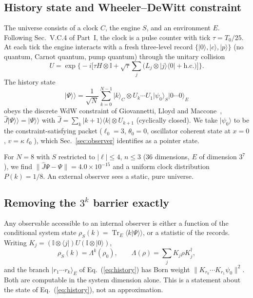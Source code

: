 \documentclass[aps,prc,twocolumn,superscriptaddress,amsmath,amssymb,nofootinbib]{revtex4-2}
\newcommand{\ket}[1]{\lvert #1\rangle}
\newcommand{\bra}[1]{\langle #1\rvert}
\newcommand{\kket}[1]{\lvert #1\rangle\rangle}
\newcommand{\Tr}{\operatorname{Tr}}
\begin{document}
\subsection{History state and Wheeler--DeWitt constraint}
The universe consists of a clock $C$, the engine $S$, and an environment $E$. Following Sec.~V.C.4 of Part~I, the clock is a pulse counter with tick $\tau=T_0/25$. At each tick the engine interacts with a fresh three-level record $\{\ket0,\ket{c},\ket{p}\}$ (no quantum, Carnot quantum, pump quantum) through the unitary collision~\cite{Ciccarello2022}
\begin{equation}
U=\exp\Big\{-i\Big[\tau H\otimes\mathbb{I}+\sqrt\tau\sum_{j}\big(L_j\otimes\ket{j}\bra0+\text{h.c.}\big)\Big]\Big\}.
\label{eq:collision}
\end{equation}
The history state
\begin{equation}
\kket\Psi=\frac1{\sqrt N}\sum_{k=0}^{N-1}\ket k_C\otimes U_k\cdots U_1\ket{\psi_0}_S\ket{0\cdots0}_E
\label{eq:history}
\end{equation}
obeys the discrete WdW constraint of Giovannetti, Lloyd and Maccone~\cite{GLM2015}, $\hat J\kket\Psi=\kket\Psi$ with $\hat J=\sum_k\ket{k+1}\bra k\otimes U_{k+1}$ (cyclically closed). We take $\ket{\psi_0}$ to be the constraint-satisfying packet ($\ell_0=3$, $\theta_0=0$, oscillator coherent state at $x=0$, $v=\kappa\ell_0$), which Sec.~\ref{sec:observer} identifies as a pointer state.

For $N=8$ with $S$ restricted to $|\ell|\le4$, $n\le3$ (36 dimensions, $E$ of dimension $3^7$), we find $\|\hat J\Psi-\Psi\|=4.0\times10^{-15}$ and a uniform clock distribution $P(k)=1/8$. An external observer sees a static, pure universe.

\subsection{Removing the $3^k$ barrier exactly}
Any observable accessible to an internal observer is either a function of the conditional system state $\rho_S(k)=\Tr_E\langle k|\Psi\rangle\rangle$, or a statistic of the records. Writing $K_j=(\mathbb{I}\otimes\bra j)U(\mathbb{I}\otimes\ket0)$,
\begin{equation}
\rho_S(k)=\Lambda^k(\rho_0),\qquad \Lambda(\rho)=\sum_jK_j\rho K_j^\dagger ,
\end{equation}
and the branch $\ket{r_1\cdots r_k}_E$ of Eq.~(\ref{eq:history}) has Born weight $\|K_{r_k}\cdots K_{r_1}\psi_0\|^2$. Both are computable in the system dimension alone. This is a statement about the state of Eq.~(\ref{eq:history}), not an approximation.
\end{document}
